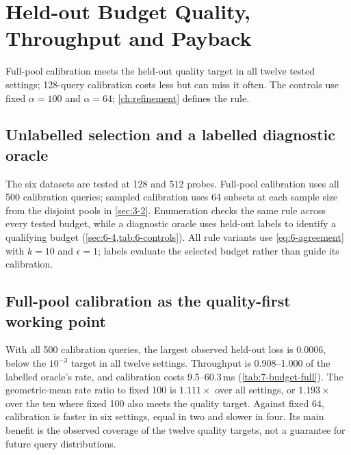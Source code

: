 \section{Held-out Budget Quality, Throughput and Payback}
\label{sec:7-5}

Full-pool calibration meets the held-out quality target in all twelve
tested settings; 128-query calibration costs less but can miss it often.
The controls use fixed
$\alpha=100$ and $\alpha=64$; \cref{ch:refinement} defines the rule.

\subsection{Unlabelled selection and a labelled diagnostic oracle}

The six datasets are tested at 128 and 512 probes. Full-pool calibration
uses all 500 calibration queries; sampled calibration uses 64 subsets at
each sample size from the disjoint pools in \cref{sec:3-2}. Enumeration
checks the same rule across every tested budget, while a diagnostic
oracle uses held-out labels to identify a qualifying budget
(\cref{sec:6-4,tab:6-controls}). All rule variants use
\cref{eq:6-agreement} with $k=10$ and $\epsilon=1$; labels evaluate the
selected budget rather than guide its calibration.

\subsection{Full-pool calibration as the quality-first working point}

With all 500 calibration queries, the largest observed held-out loss
is 0.0006, below the $10^{-3}$ target in all twelve settings.
Throughput is 0.908--1.000 of the labelled oracle's rate, and calibration
costs 9.5--60.3\,ms (\cref{tab:7-budget-full}). The geometric-mean rate
ratio to fixed 100 is $1.111\times$ over all settings, or
$1.193\times$ over the ten where fixed 100 also meets the quality target.
Against fixed 64, calibration is faster in six settings, equal in two
and slower in four. Its main benefit is the observed coverage of the
twelve quality targets, not a guarantee for future query distributions.

\begin{table}[!htbp]
\centering
\caption[Full-pool budget calibration]{Full-pool calibration ($S=500$). Loss is relative to the best
measured held-out recall; rates are kQPS from the selected fixed arm.
``Cal.'' is one full-pool calibration call per cell, not a repeated
stream timing. Held-out counts are 500, or 499 for Stella.}
\label{tab:7-budget-full}
\footnotesize\setlength{\tabcolsep}{3pt}

\end{table}

